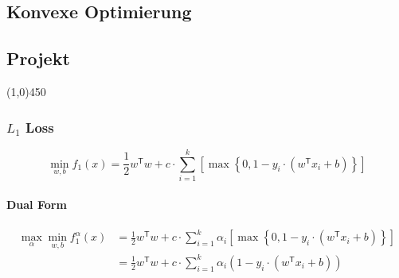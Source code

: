 \documentclass[12pt,landscape]{article}
\newcommand{\hr}{\begin{center} \line(1,0){450} \end{center}}
\newcommand{\tr}{^\mathsf{T}}
\begin{document}
\begin{center}
	\section*{Konvexe Optimierung}
	\subsection*{Projekt}
\end{center}
\hr
\subsubsection*{$L_1$ Loss}
\newcommand{\oneLossReg}{\max \left\{ 0,1-y_i \cdot \left( w\tr x_i + b \right) \right\}}
\begin{equation}
\min\limits_{w,b} f_1(x) = \frac{1}{2} w\tr w +c \cdot \sum\limits_{i=1}^k \left[ \oneLossReg \right]
\end{equation}
\paragraph{Dual Form}

\begin{align}
\max\limits_{\alpha} \min\limits_{w,b} f_1^\alpha(x) &= \frac{1}{2} w\tr w +c \cdot \sum\limits_{i=1}^k \alpha_i \left[ \oneLossReg \right] \nonumber \\
&= \frac{1}{2} w\tr w +c \cdot \sum\limits_{i=1}^k \alpha_i \left(  1-y_i \cdot \left( w\tr x_i + b \right) \right)\\
\end{align}
\end{document}
